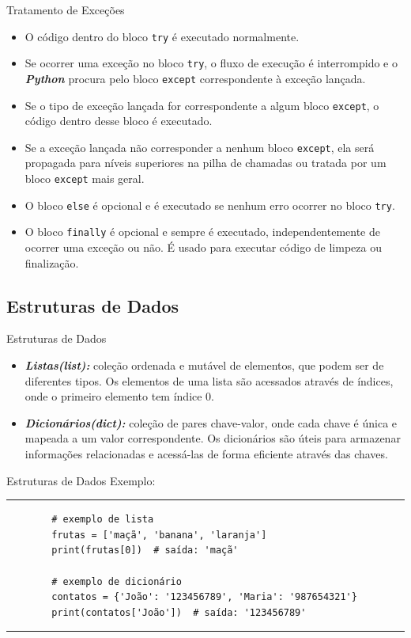 \documentclass{beamer}
\begin{document}
\begin{frame}[fragile]{Tratamento de Exceções}
\begin{itemize}
	\item O código dentro do bloco \texttt{try} é executado normalmente.
	\item Se ocorrer uma exceção no bloco \texttt{try}, o fluxo de execução é interrompido e o \textbf{\textit{Python}} procura pelo bloco \texttt{except} correspondente à exceção lançada.
	\item Se o tipo de exceção lançada for correspondente a algum bloco \texttt{except}, o código dentro desse bloco é executado.
	\item Se a exceção lançada não corresponder a nenhum bloco \texttt{except}, ela será propagada para níveis superiores na pilha de chamadas ou tratada por um bloco \texttt{except} mais geral.
	\item O bloco \texttt{else} é opcional e é executado se nenhum erro ocorrer no bloco \texttt{try}.
	\item O bloco \texttt{finally} é opcional e sempre é executado, independentemente de ocorrer uma exceção ou não. É usado para executar código de limpeza ou finalização.
\end{itemize}
\end{frame}


\subsection{Estruturas de Dados}

\begin{frame}[fragile]{Estruturas de Dados}
	\begin{itemize}
		\item \textbf{\textit{Listas(list):}} coleção ordenada e mutável de elementos, que podem ser de diferentes tipos. Os elementos de uma lista são acessados através de índices, onde o primeiro elemento tem índice 0.
		\item \textbf{\textit{Dicionários(dict):}} coleção de pares chave-valor, onde cada chave é única e mapeada a um valor correspondente. Os dicionários são úteis para armazenar informações relacionadas e acessá-las de forma eficiente através das chaves.
	\end{itemize}
\end{frame}

\begin{frame}[fragile]{Estruturas de Dados}
	Exemplo:
	\rule{\textwidth}{1pt}
	\scriptsize
	\begin{verbatim}
		# exemplo de lista
		frutas = ['maçã', 'banana', 'laranja']
		print(frutas[0])  # saída: 'maçã'
		
		# exemplo de dicionário
		contatos = {'João': '123456789', 'Maria': '987654321'}
		print(contatos['João'])  # saída: '123456789'
	\end{verbatim}
	\rule{\textwidth}{1pt}
\end{frame}
\end{document}
